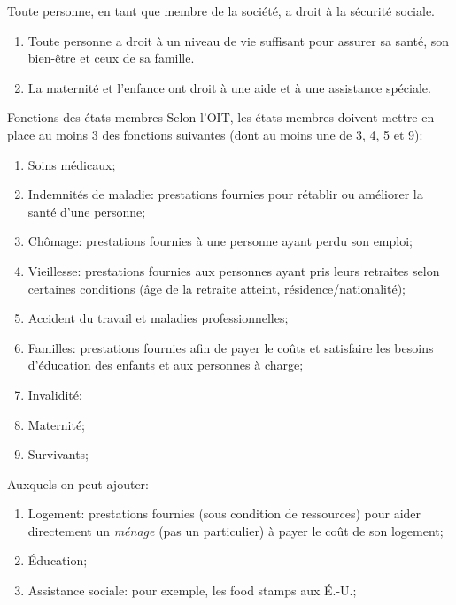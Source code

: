 \documentclass[10pt, french]{article}
\begin{document}
\begin{multicols*}{3}
\begin{rappel_enhanced}
\begin{distributions}[Article 22]
Toute personne, en tant que membre de la société, a droit à la sécurité sociale.
\end{distributions}
\begin{distributions}[Article 25]
\begin{enumerate}[leftmargin = *]
	\item	Toute personne a droit à un niveau de vie suffisant pour assurer sa santé, son bien-être et ceux de sa famille.
	\item	La maternité et l'enfance ont droit à une aide et à une assistance spéciale.
\end{enumerate}
\end{distributions}
\end{rappel_enhanced}

\begin{conceptgen}{Fonctions des états membres}
Selon l'OIT, les états membres doivent mettre en place au moins 3 des fonctions suivantes (dont au moins une de 3, 4, 5 et 9): 
\begin{enumerate}[leftmargin = *]
	\item	Soins médicaux;
	\item	Indemnités de maladie: prestations fournies pour rétablir ou améliorer la santé d'une personne;
	\item	Chômage: prestations fournies à une personne ayant perdu son emploi;
	\item	Vieillesse: prestations fournies aux personnes ayant pris leurs retraites selon certaines conditions (âge de la retraite atteint, résidence/nationalité);
	\item	Accident du travail et maladies professionnelles;
	\item	Familles: prestations fournies afin de payer le coûts et satisfaire les besoins d'éducation des enfants et aux personnes à charge;
	\item	Invalidité;
	\item	Maternité;
	\item	Survivants;
\end{enumerate}

Auxquels on peut ajouter:
\begin{multicols*}{3}
\begin{enumerate}[leftmargin = *]
	\item	Logement: prestations fournies (sous condition de ressources) pour aider directement un \textit{ménage} (pas un particulier) à payer le coût de son logement;
	\item	Éducation;
	\item	Assistance sociale: pour exemple, les food stamps aux É.-U.;
\end{enumerate}
\end{multicols*}
\end{conceptgen}


\end{multicols*}
\end{document}
